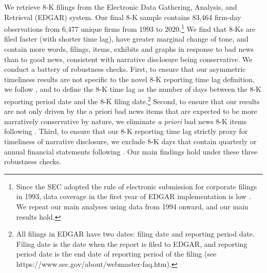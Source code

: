 \documentclass[letterpaper,12pt]{article}
\begin{document}
\begin{spacing}{1.5}
We retrieve 8-K filings from the Electronic Data Gathering, Analysis, and Retrieval (EDGAR) system.  Our final 8-K sample contains 83,464 firm-day observations from 6,477 unique firms from 1993 to 2020.\footnote{Since the SEC adopted the rule of electronic submission for corporate filings in 1993, data coverage in the first year of EDGAR implementation is low \cite{gaoInformingMarketEffect2020}. We repeat our main analyses using data from 1994 onward, and our main results hold.} We find that 8-Ks are filed faster (with shorter time lag), have greater marginal change of tone, and contain more words, filings, items, exhibits and graphs in response to bad news than to good news, consistent with narrative disclosure being conservative.
We conduct a battery of robustness checks. First, to ensure that our asymmetric timeliness results are not specific to the novel 8-K reporting time lag definition, we follow ,  and  to define the 8-K time lag as the number of days between the 8-K reporting period date and the 8-K filing date.\footnote{All filings in EDGAR have two dates: filing date and reporting period date. Filing date is the date when the report is filed to EDGAR, and reporting period date is the end date of reporting period of the filing (see https://www.sec.gov/about/webmaster-faq.htm).} Second, to ensure that our results are not only driven by the a priori bad news items that are expected to be more narratively conservative by nature, we eliminate \textit{a priori} bad news 8-K items following . Third, to ensure that our 8-K reporting time lag strictly proxy for timeliness of narrative disclosure, we exclude 8-K days that contain quarterly or annual financial statements following . Our main findings hold under these three robustness checks.


\end{spacing}
\end{document}
